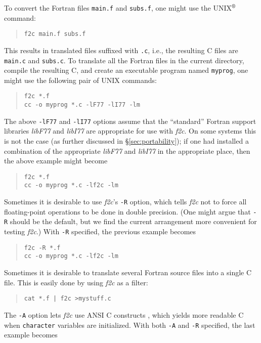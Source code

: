 \documentclass[10pt,a4paper]{article}
\begin{document}
To convert the Fortran files \verb|main.f| and \verb|subs.f|, one might use the UNIX$^{\text{\textregistered}}$ command:
\begin{quote}
\begin{verbatim}
f2c main.f subs.f
\end{verbatim}
\end{quote}
This results in translated files suffixed with \verb|.c|, i.e., the resulting C files are \verb|main.c| and \verb|subs.c|. To translate all the Fortran files in the current directory, compile the resulting C, and create an executable program named \verb|myprog|, one might use the following pair of UNIX commands:
\begin{quote}
\begin{verbatim}
f2c *.f
cc -o myprog *.c -lF77 -lI77 -lm
\end{verbatim}
\end{quote}
The above \verb|-lF77| and \verb|-lI77| options assume that the ``standard'' Fortran support libraries \emph{libF77} and \emph{libI77} are appropriate for use with \emph{f2c}. On some systems this is not the case (as further discussed in §\ref{sec:portability}); if one had installed a combination of the appropriate \emph{libF77} and \emph{libI77} in the appropriate place, then the above example might become
\begin{quote}
\begin{verbatim}
f2c *.f
cc -o myprog *.c -lf2c -lm
\end{verbatim}
\end{quote}
Sometimes it is desirable to use \emph{f2c}’s \verb|-R| option, which tells \emph{f2c} not to force all floating-point operations to be done in double precision. (One might argue that \verb|-R| should be the default, but we find the current arrangement more convenient for testing \emph{f2c}.) With \verb|-R| specified, the previous example becomes
\begin{quote}
\begin{verbatim}
f2c -R *.f
cc -o myprog *.c -lf2c -lm
\end{verbatim}
\end{quote}
Sometimes it is desirable to translate several Fortran source files into a single C file. This is easily done by using \emph{f2c} as a filter:
\begin{quote}
\begin{verbatim}
cat *.f | f2c >mystuff.c
\end{verbatim}
\end{quote}
The \verb|-A| option lets \emph{f2c} use ANSI C constructs \citep{3}, which yields more readable C when \verb|character| variables are initialized. With both \verb|-A| and \verb|-R| specified, the last example becomes
\end{document}
